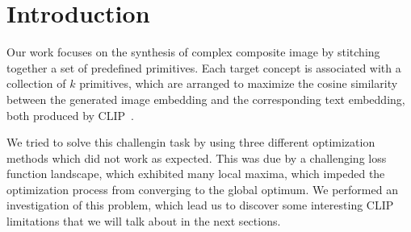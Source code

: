 \documentclass{article}
\begin{document}

\printAffiliationsAndNotice{}

\begin{abstract}
%
In this paper we explore the task of creating a composite image described by a natural language prompt from a set of given primitives, such as combining “person” and “umbrella” to form “a person under an umbrella.” Each primitive is represented as a visual element and a composition function arranges them spatially to form a complete scene. We use CLIP to guide this composition by evaluating how well the rasterized image of the composed scene aligns with the target natural language description. The optimization objective is to maximize the cosine similarity between the image embedding and the text embedding produced by CLIP.
%
\end{abstract}

\section{Introduction}

Our work focuses on the synthesis of complex composite image by stitching together a set of predefined primitives. Each target concept is associated with a collection of $k$ primitives, which are arranged to maximize the cosine similarity between the generated image embedding and the corresponding text embedding, both produced by CLIP~\cite{DBLP:journals/corr/abs-2103-00020}. 

We tried to solve this challengin task by using three different optimization methods which did not work as expected. This was due by a challenging loss function landscape, which exhibited many local maxima, which impeded the optimization process from converging to the global optimum. We performed an investigation of this problem, which lead us to discover some interesting CLIP limitations that we will talk about in the next sections.
\end{document}
